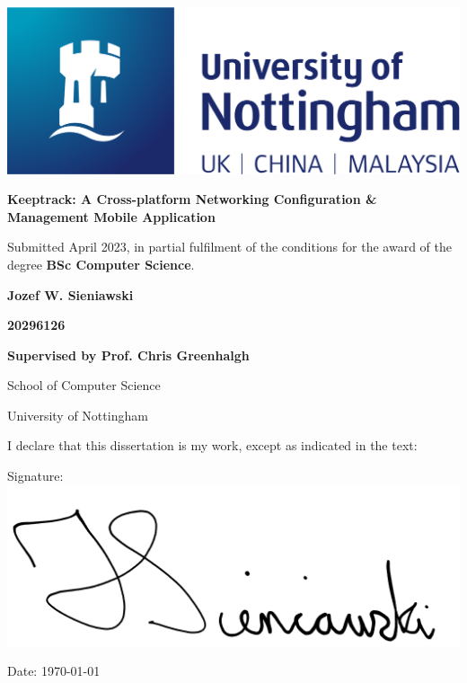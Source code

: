 \documentclass [11pt,a4paper]{article}
\begin{document}
 
\thispagestyle{empty}
\begin{center}
    \centering
    \includegraphics[width=0.5\linewidth]{images/nottingham-logo.png}
    \vspace{2.5cm}
    {\Large \par}
    {\LARGE \textbf{Keeptrack: A Cross-platform Networking Configuration \& Management Mobile Application}\par}
    \vspace{1.5cm}
    {\small Submitted April 2023, in partial fulfilment of \break the conditions for the award of the degree \textbf{BSc Computer Science}.\par}
    \vspace{1cm}
    {\Large \textbf{Jozef W. Sieniawski}\par}
    {\textbf{20296126}\par}
    \vspace{1cm}
    {\normalsize \textbf{Supervised by Prof. Chris Greenhalgh}\par}
    \vspace{1cm}
    {\normalsize School of Computer Science\par}
    {\normalsize University of Nottingham\par}
    \vspace{2cm}
    {\normalsize I declare that this dissertation is my work, except as indicated in the text:\par}
    \vspace{1cm}
    {\normalsize Signature: \underline{ \includegraphics[width=0.25\linewidth]{images/signature.png}}\par}
    \vspace{0.25cm}
    {\normalsize Date: \today\par}
\end{center}

\pagebreak
{}
\pagebreak
\end{document}
